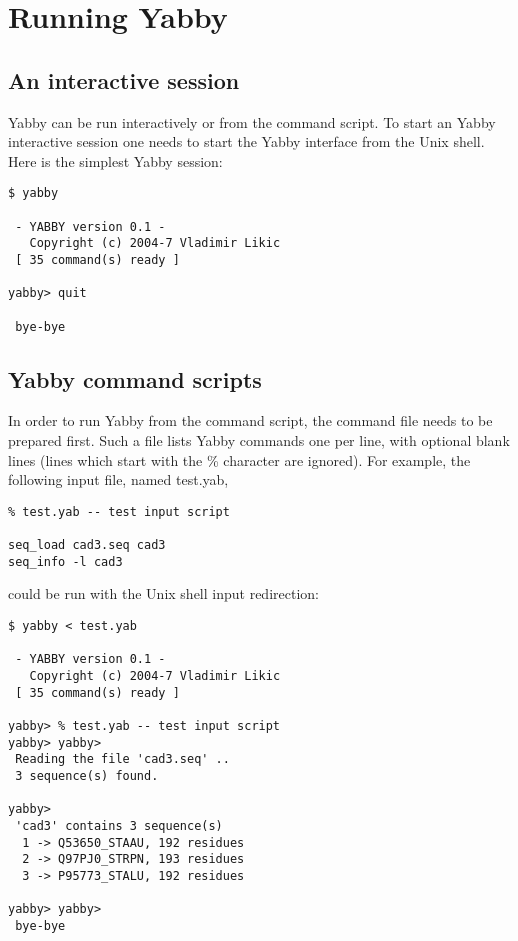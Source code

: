 \section{Running Yabby}

\subsection{An interactive session}

Yabby can be run interactively or from the command script. To
start an Yabby interactive session one needs to start the Yabby
interface from the Unix shell. Here is the simplest Yabby session:

\begin{verbatim}
$ yabby

 - YABBY version 0.1 - 
   Copyright (c) 2004-7 Vladimir Likic
 [ 35 command(s) ready ]

yabby> quit

 bye-bye
\end{verbatim}

\subsection{Yabby command scripts}

In order to run Yabby from the command script, the command file
needs to be prepared first. Such a file lists Yabby commands
one per line, with optional blank lines (lines which start with
the \% character are ignored). For example, the following input
file, named test.yab,

\begin{verbatim}
% test.yab -- test input script

seq_load cad3.seq cad3
seq_info -l cad3
\end{verbatim}

could be run with the Unix shell input redirection:

\begin{verbatim}
$ yabby < test.yab

 - YABBY version 0.1 - 
   Copyright (c) 2004-7 Vladimir Likic
 [ 35 command(s) ready ]

yabby> % test.yab -- test input script
yabby> yabby> 
 Reading the file 'cad3.seq' ..
 3 sequence(s) found.

yabby> 
 'cad3' contains 3 sequence(s)
  1 -> Q53650_STAAU, 192 residues
  2 -> Q97PJ0_STRPN, 193 residues
  3 -> P95773_STALU, 192 residues

yabby> yabby> 
 bye-bye
\end{verbatim}

